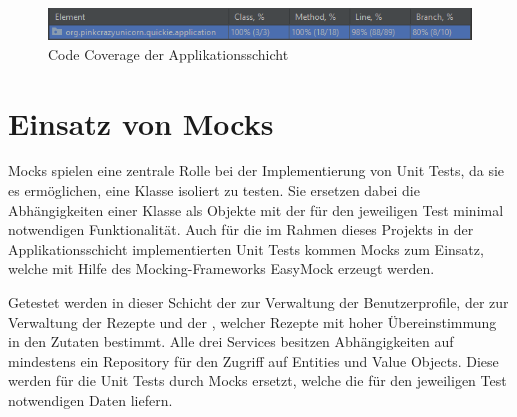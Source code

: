 \begin{figure}[ht!]
    \includegraphics[width=0.98\columnwidth]{Bilder/code-coverage.png}
    \caption{Code Coverage der Applikationsschicht}
    \label{fig:code-coverage}
\end{figure}

\section{Einsatz von Mocks}
\label{sec:mocks}
Mocks spielen eine zentrale Rolle bei der Implementierung von Unit Tests, da sie es ermöglichen, eine Klasse isoliert zu testen. Sie ersetzen dabei die Abhängigkeiten einer Klasse als Objekte mit der für den jeweiligen Test minimal notwendigen Funktionalität. Auch für die im Rahmen dieses Projekts in der Applikationsschicht implementierten Unit Tests kommen Mocks zum Einsatz, welche mit Hilfe des Mocking-Frameworks EasyMock erzeugt werden.

Getestet werden in dieser Schicht der  zur Verwaltung der Benutzerprofile, der  zur Verwaltung der Rezepte und der , welcher Rezepte mit hoher Übereinstimmung in den Zutaten bestimmt. Alle drei Services besitzen Abhängigkeiten auf mindestens ein Repository für den Zugriff auf Entities und Value Objects. Diese werden für die Unit Tests durch Mocks ersetzt, welche die für den jeweiligen Test notwendigen Daten liefern.
